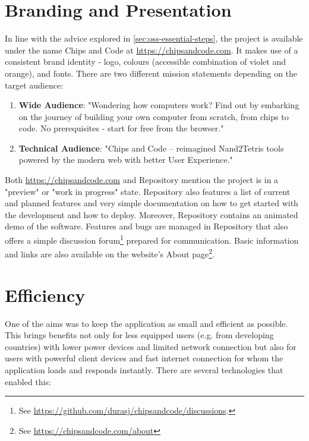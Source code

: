 \section{Branding and Presentation}

In line with the advice explored in \autoref{sec:oss-essential-steps}, the project is available under the name Chips and Code at \href{chipsandcode.com}{https://chipsandcode.com}.
It makes use of a consistent brand identity - logo, colours (accessible combination of violet and orange), and fonts.
There are two different mission statements depending on the target audience:

\begin{enumerate}
    \item \textbf{Wide Audience}: "Wondering how computers work? Find out by embarking on the journey of building your own computer from scratch, from chips to code. No prerequisites - start for free from the browser."
    \item \textbf{Technical Audience}: "Chips and Code – reimagined Nand2Tetris tools powered by the modern web with better User Experience."
\end{enumerate}

Both \href{chipsandcode.com}{https://chipsandcode.com} and Repository mention the project is in a "preview" or "work in progress" state.
Repository also features a list of current and planned features and very simple documentation on how to get started with the development and how to deploy.
Moreover, Repository contains an animated demo of the software.
Features and bugs are managed in Repository that also offers a simple discussion forum\footnote{See \url{https://github.com/durasj/chipsandcode/discussions}.} prepared for communication.
Basic information and links are also available on the website's About page\footnote{See \url{https://chipsandcode.com/about}}.

\section{Efficiency}

One of the aims was to keep the application as small and efficient as possible.
This brings benefits not only for less equipped users (e.g. from developing countries) with lower power devices and limited network connection but also for users with powerful client devices and fast internet connection for whom the application loads and responds instantly.
There are several technologies that enabled this:

